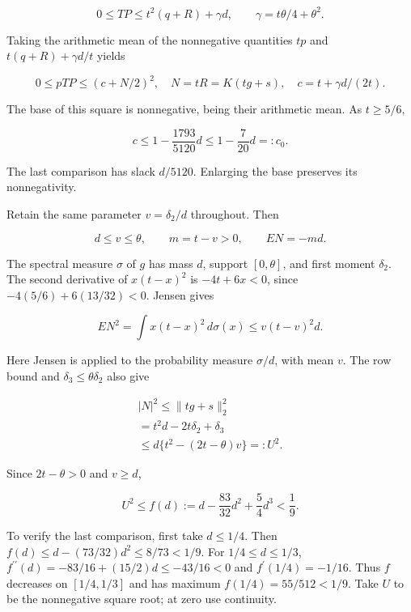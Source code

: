 \[
0\le TP\le t^2(q+R)+\gamma d,
\qquad\gamma=t\theta/4+\theta^2.
\tag{Q62.2.3}\label{eq:Q62:Q62:2:3}
\]


Taking the arithmetic mean of the nonnegative quantities $tp$ and $t(q+R)+\gamma d/t$ yields

\[
0\le pTP\le(c+N/2)^2,
\quad N=tR=K(tg+s),
\quad c=t+\gamma d/(2t).
\tag{Q62.2.4}\label{eq:Q62:Q62:2:4}
\]

The base of this square is nonnegative, being their arithmetic mean.
As $t\ge\allowbreak 5/6$,

\[
c\le1-\frac{1793}{5120}d\le1-\frac7{20}d=:c_0.
\tag{Q62.2.5}\label{eq:Q62:Q62:2:5}
\]

The last comparison has slack $d/5120$. Enlarging the base preserves its nonnegativity.

Retain the same parameter $v=\allowbreak \delta_2/d$ throughout. Then

\[
d\le v\le\theta,\qquad m=t-v>0,\qquad EN=-m d.
\tag{Q62.2.6}\label{eq:Q62:Q62:2:6}
\]

The spectral measure $\sigma$ of $g$ has mass $d$, support $[0,\allowbreak  \theta]$,
and first moment $\delta_2$. The second derivative of $x(t-x)^2$ is $-4t+6x<\allowbreak 0$,
since $-4(5/6)+6(13/32)<\allowbreak 0$. Jensen gives

\[
EN^2=\int x(t-x)^2\,d\sigma(x)
\le v(t-v)^2d.
\tag{Q62.2.7}\label{eq:Q62:Q62:2:7}
\]

Here Jensen is applied to the probability measure $\sigma/d$, with mean $v$.
The row bound and $\delta_3\le\allowbreak \theta \delta_2$ also give

\[
\begin{gathered}
|N|^2\le\|tg+s\|_2^2\\
=t^2d-2t\delta_2+\delta_3\\
\le d\{t^2-(2t-\theta)v\}=:U^2.
\end{gathered}\tag{Q62.2.8}\label{eq:Q62:Q62:2:8}
\]

Since $2t-\theta>\allowbreak 0$ and $v\ge\allowbreak  d$,

\[
U^2\le f(d):=d-\frac{83}{32}d^2+\frac54d^3<\frac19.
\tag{Q62.2.9}\label{eq:Q62:Q62:2:9}
\]

To verify the last comparison, first take $d\le\allowbreak 1/4$. Then
$f(d)\le\allowbreak  d-(73/32)d^2\le\allowbreak 8/73<\allowbreak 1/9$.
For $1/4\le\allowbreak  d\le\allowbreak 1/3$,
$f^{\prime\prime}(d)=\allowbreak -83/16+(15/2)d\le\allowbreak -43/16<\allowbreak 0$ and $f^\prime(1/4)=\allowbreak -1/16$.
Thus $f$ decreases on $[1/4,\allowbreak  1/3]$ and has maximum $f(1/4)=\allowbreak 55/512<\allowbreak 1/9$.
Take $U$ to be the nonnegative square root; at zero use continuity.

